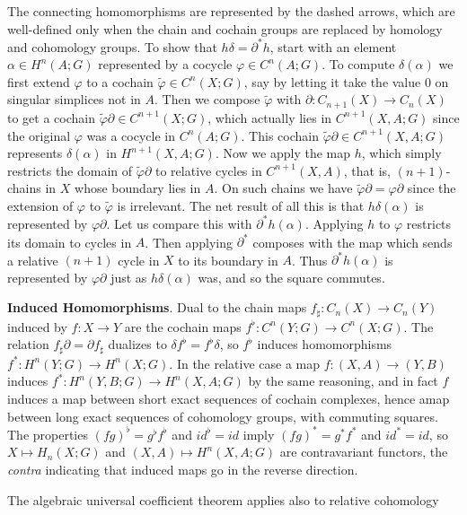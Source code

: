 The connecting homomorphisms are represented by the dashed arrows, which are well-defined only when the chain and cochain groups are replaced by homology and
cohomology groups. To show that $h\delta=\partial^*h$, start with an element $\alpha\in H^n(A;G)$ represented by a cocycle $\varphi\in C^n(A;G)$. To compute $\delta(\alpha)$ we first extend $\varphi$ to a cochain $\widetilde{\varphi}\in C^n(X;G)$, say by letting it take the value $0$ on singular simplices not in
$A$. Then we compose $\widetilde{\varphi}$ with $\partial:C_{n+1}(X)\to C_n(X)$ to get a cochain $\widetilde{\varphi}\partial\in C^{n+1}(X;G)$, which actually lies in $C^{n+1}(X,A;G)$ since the original $\varphi$ was a cocycle in $C^n(A;G)$. This cochain $\widetilde{\varphi}\partial\in C^{n+1}(X,A;G)$ represents $\delta(\alpha)$ in $H^{n+1}(X,A;G)$. Now we apply the map $h$, which simply restricts the domain of $\widetilde{\varphi}\partial$ to relative cycles in $C^{n+1}(X,A)$, that is, $(n+1)$-chains in $X$ whose boundary lies in $A$. On such chains we have $\widetilde{\varphi}\partial=\varphi\partial$ since the extension of $\varphi$ to $\widetilde{\varphi}$ is irrelevant. The net result of all this is that $h\delta(\alpha)$ is represented by $\varphi\partial$. Let us compare this with $\partial^*h(\alpha)$. Applying $h$ to $\varphi$ restricts its domain to cycles in $A$. Then applying $\partial^*$ composes with the map which sends a relative $(n+1)$ cycle in $X$ to its boundary in $A$. Thus $\partial^*h(\alpha)$ is represented by $\varphi\partial$ just as $h\delta(\alpha)$ was, and so the square commutes.\par
\textbf{Induced Homomorphisms}. Dual to the chain maps $f_\sharp:C_n(X)\to C_n(Y)$ induced by $f:X\to Y$ are the cochain maps $f^\flat:C^n(Y;G)\to C^n(X;G)$. The relation $f_\sharp\partial=\partial f_\sharp$ dualizes to $\delta f^\flat=f^\flat\delta$, so $f^\flat$ induces homomorphisms $f^*:H^n(Y;G)\to H^n(X;G)$. In the relative case a map $f:(X,A)\to (Y,B)$ induces $f^*:H^n(Y, B;G)\to H^n(X,A;G)$ by the same reasoning, and in fact $f$ induces a map between short exact sequences of cochain complexes, hence amap between long exact sequences of cohomology groups, with commuting squares. The properties $(fg)^\flat=g^\flat f^\flat$ and $id^\flat=id$ imply $(fg)^*=g^*f^*$ and $id^*=id$, so $X\mapsto H_n(X;G)$ and $(X,A)\mapsto H^n(X,A;G)$ are contravariant functors, the \textit{contra} indicating that induced maps go in the reverse direction.\par
The algebraic universal coefficient theorem applies also to relative cohomology
